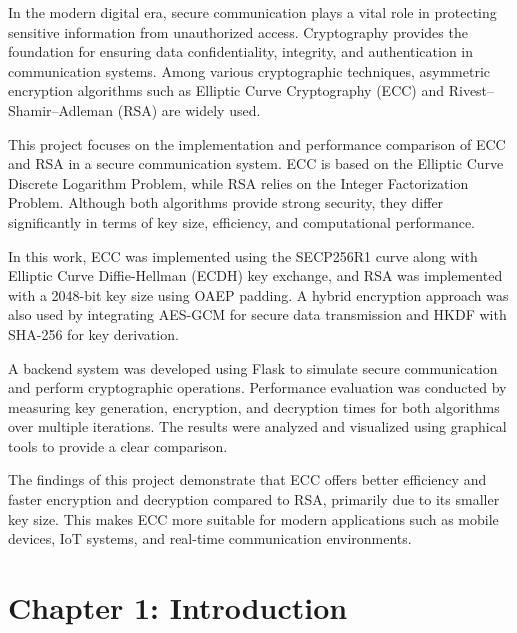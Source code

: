 \documentclass[12pt, a4paper]{report}
\begin{document}
\begin{onehalfspacing}
In the modern digital era, secure communication plays a vital role in protecting sensitive information from unauthorized access. Cryptography provides the foundation for ensuring data confidentiality, integrity, and authentication in communication systems. Among various cryptographic techniques, asymmetric encryption algorithms such as Elliptic Curve Cryptography (ECC) and Rivest–Shamir–Adleman (RSA) are widely used.

This project focuses on the implementation and performance comparison of ECC and RSA in a secure communication system. ECC is based on the Elliptic Curve Discrete Logarithm Problem, while RSA relies on the Integer Factorization Problem. Although both algorithms provide strong security, they differ significantly in terms of key size, efficiency, and computational performance.

In this work, ECC was implemented using the SECP256R1 curve along with Elliptic Curve Diffie-Hellman (ECDH) key exchange, and RSA was implemented with a 2048-bit key size using OAEP padding. A hybrid encryption approach was also used by integrating AES-GCM for secure data transmission and HKDF with SHA-256 for key derivation.

A backend system was developed using Flask to simulate secure communication and perform cryptographic operations. Performance evaluation was conducted by measuring key generation, encryption, and decryption times for both algorithms over multiple iterations. The results were analyzed and visualized using graphical tools to provide a clear comparison.

The findings of this project demonstrate that ECC offers better efficiency and faster encryption and decryption compared to RSA, primarily due to its smaller key size. This makes ECC more suitable for modern applications such as mobile devices, IoT systems, and real-time communication environments.
\end{onehalfspacing}

\clearpage

\tableofcontents
\clearpage

\setcounter{page}{4}

\chapter*{Chapter 1: Introduction}
\end{document}
